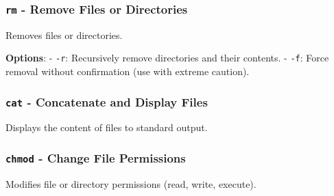 \documentclass[11pt,a4paper]{article}
\begin{document}
\subsubsection{\texorpdfstring{\texttt{rm} - Remove Files or
Directories}{rm - Remove Files or Directories}}\label{rm---remove-files-or-directories}

Removes files or directories.

\begin{Shaded}
\begin{Highlighting}[]
 \PreprocessorTok{[}\PreprocessorTok{]} \PreprocessorTok{[}\PreprocessorTok{]}
\end{Highlighting}
\end{Shaded}

\textbf{Options}: - \texttt{-r}: Recursively remove directories and
their contents. - \texttt{-f}: Force removal without confirmation (use
with extreme caution).

\subsubsection{\texorpdfstring{\texttt{cat} - Concatenate and Display
Files}{cat - Concatenate and Display Files}}\label{cat---concatenate-and-display-files}

Displays the content of files to standard output.

\begin{Shaded}
\begin{Highlighting}[]
 \PreprocessorTok{[}\PreprocessorTok{]}
\end{Highlighting}
\end{Shaded}

\subsubsection{\texorpdfstring{\texttt{chmod} - Change File
Permissions}{chmod - Change File Permissions}}\label{chmod---change-file-permissions}

Modifies file or directory permissions (read, write, execute).

\begin{Shaded}
\begin{Highlighting}[]
 \PreprocessorTok{[}\PreprocessorTok{]}
\end{Highlighting}
\end{Shaded}
\end{document}
